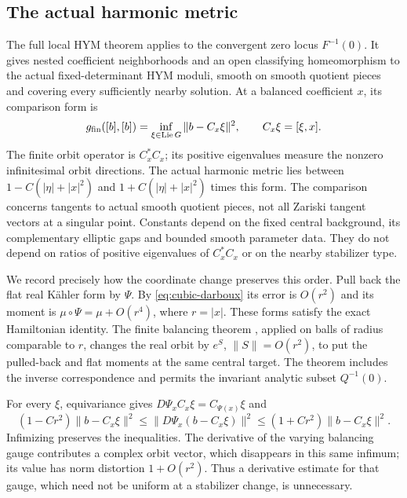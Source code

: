 \subsection{The actual harmonic metric}
The full local HYM theorem \cite[Theorem~1.1 and Sections~3,5]{wuebben15}
applies to the convergent zero locus $F^{-1}(0)$. It gives nested
coefficient neighborhoods and an open classifying homeomorphism to
the actual fixed-determinant HYM moduli, smooth on smooth quotient
pieces and covering every sufficiently nearby solution. At a
balanced coefficient $x$, its comparison form is
\begin{equation}\label{eq:complex-orbit-minimum}
 g_{\rm fin}([b],[b])=
       \inf_{\xi\in\operatorname{Lie} G}\|b-C_x\xi\|^2,
 \qquad C_x\xi=[\xi,x].
\end{equation}
The finite orbit operator is $C_x^*C_x$; its positive eigenvalues
measure the nonzero infinitesimal orbit directions.
The actual harmonic metric lies between $1-C(|\eta|+|x|^2)$ and
$1+C(|\eta|+|x|^2)$ times this form. The comparison concerns
tangents to actual smooth quotient pieces, not all Zariski tangent
vectors at a singular point. Constants depend on the fixed central
background, its complementary elliptic gaps and bounded smooth
parameter data. They do not depend on ratios of positive eigenvalues
of $C_x^*C_x$ or on the nearby stabilizer type.

We record precisely how the coordinate change preserves this order.
Pull back the flat real K\"ahler form by $\Psi$. By
\eqref{eq:cubic-darboux} its error is $O(r^2)$ and its moment is
$\mu\circ\Psi=\mu+O(r^4)$, where $r=|x|$. These forms satisfy
the exact Hamiltonian identity. The finite balancing theorem
\cite[Theorem~2.1]{wuebben14}, applied on balls of radius comparable
to $r$, changes the real orbit by $e^S$, $\|S\|=O(r^2)$, to put
the pulled-back and flat moments at the same central target.
The theorem includes the inverse correspondence and permits the
invariant analytic subset $Q^{-1}(0)$.

For every $\xi$, equivariance gives
$D\Psi_x C_x\xi=C_{\Psi(x)}\xi$ and
\[
 (1-Cr^2)\|b-C_x\xi\|^2
 \le\|D\Psi_x(b-C_x\xi)\|^2
 \le(1+Cr^2)\|b-C_x\xi\|^2.
\]
Infimizing preserves the inequalities. The derivative of the
varying balancing gauge contributes a complex orbit vector,
which disappears in this same infimum; its value has norm
distortion $1+O(r^2)$. Thus a derivative estimate for that gauge,
which need not be uniform at a stabilizer change, is unnecessary.

